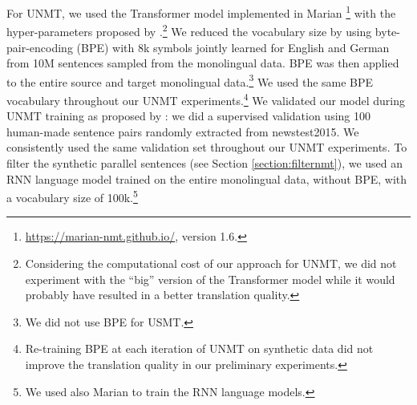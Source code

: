 \documentclass[11pt,a4paper]{article}
\newcommand{\marian}{Marian}
\begin{document}
For UNMT, we used the Transformer \citep{NIPS2017_7181} model implemented in {\marian} \citep{P18-4020}\footnote{\url{https://marian-nmt.github.io/}, version 1.6.} with the hyper-parameters proposed by \citet{NIPS2017_7181}.\footnote{Considering the computational cost of our approach for UNMT, we did not experiment with the ``big'' version of the Transformer model while it would probably have resulted in a better translation quality.} We reduced the vocabulary size by using byte-pair-encoding (BPE) with 8k symbols jointly learned for English and German from 10M sentences sampled from the monolingual data. BPE was then applied to the entire source and target monolingual data.\footnote{We did not use BPE for USMT.} We used the same BPE vocabulary throughout our UNMT experiments.\footnote{Re-training BPE at each iteration of UNMT on synthetic data did not improve the translation quality in our preliminary experiments.} We validated our model during UNMT training as proposed by \citet{DBLP:journals/corr/abs-1804-07755}: we did a supervised validation using 100 human-made sentence pairs randomly extracted from newstest2015. We consistently used the same validation set throughout our UNMT experiments. To filter the synthetic parallel sentences (see Section \ref{section:filternmt}), we used an RNN language model trained on the entire monolingual data, without BPE, with a vocabulary size of 100k.\footnote{We used also {\marian} to train the RNN language models.}
\end{document}

